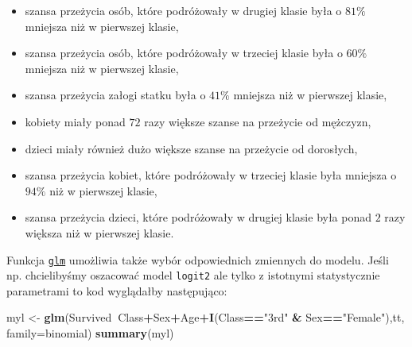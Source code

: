 \documentclass[polish,]{book}
\newenvironment{Shaded}{\begin{snugshade}}{\end{snugshade}}
\newcommand{\DataTypeTok}[1]{\textcolor[rgb]{0.13,0.29,0.53}{#1}}
\newcommand{\KeywordTok}[1]{\textcolor[rgb]{0.13,0.29,0.53}{\textbf{#1}}}
\newcommand{\NormalTok}[1]{#1}
\newcommand{\OperatorTok}[1]{\textcolor[rgb]{0.81,0.36,0.00}{\textbf{#1}}}
\newcommand{\StringTok}[1]{\textcolor[rgb]{0.31,0.60,0.02}{#1}}
\begin{document}
\begin{itemize}
\item
  szansa przeżycia osób, które podróżowały w drugiej klasie była o \(81\%\) mniejsza
  niż w pierwszej klasie,
\item
  szansa przeżycia osób, które podróżowały w trzeciej klasie była o \(60\%\) mniejsza niż w pierwszej klasie,
\item
  szansa przeżycia załogi statku była o \(41\%\) mniejsza niż w pierwszej klasie,
\item
  kobiety miały ponad \(72\) razy większe szanse na przeżycie od mężczyzn,
\item
  dzieci miały również dużo większe szanse na przeżycie od dorosłych,
\item
  szansa przeżycia kobiet, które podróżowały w trzeciej klasie była mniejsza o
  \(94\%\) niż w pierwszej klasie,
\item
  szansa przeżycia dzieci, które podróżowały w drugiej klasie była ponad \(2\) razy
  większa niż w pierwszej klasie.
\end{itemize}

Funkcja \href{https://rdrr.io/r/stats/glm.html}{\texttt{glm}} umożliwia także wybór odpowiednich zmiennych do modelu. Jeśli
np. chcielibyśmy oszacować model \texttt{logit2} ale tylko z istotnymi statystycznie parametrami to kod wyglądałby następująco:

\begin{Shaded}
\begin{Highlighting}[]
\NormalTok{myl <-}\StringTok{ }\KeywordTok{glm}\NormalTok{(Survived}\OperatorTok{~}\NormalTok{Class}\OperatorTok{+}\NormalTok{Sex}\OperatorTok{+}\NormalTok{Age}\OperatorTok{+}\KeywordTok{I}\NormalTok{(Class}\OperatorTok{==}\StringTok{"3rd"} \OperatorTok{&}\StringTok{ }\NormalTok{Sex}\OperatorTok{==}\StringTok{"Female"}\NormalTok{),tt,}
           \DataTypeTok{family=}\NormalTok{binomial)}
\KeywordTok{summary}\NormalTok{(myl)}
\end{Highlighting}
\end{Shaded}
\end{document}
